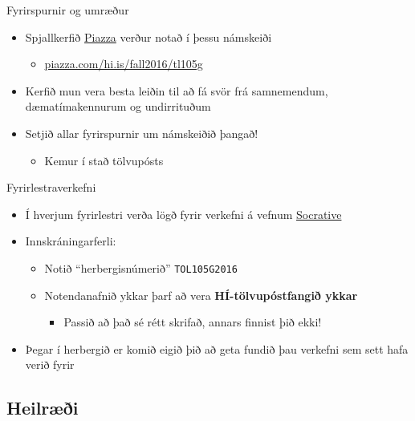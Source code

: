 \documentclass{beamer}
\begin{document}
\begin{frame}{Fyrirspurnir og umræður}
\label{frame:piazza}
\begin{itemize}
 \item Spjallkerfið \href{piazza.com/hi.is/fall2016/tl105g}{Piazza} verður notað í þessu námskeiði
 \begin{itemize}
  \item \url{piazza.com/hi.is/fall2016/tl105g}
 \end{itemize}
 \item Kerfið mun vera besta leiðin til að fá svör frá samnemendum, dæmatímakennurum og undirrituðum
 \item Setjið allar fyrirspurnir um námskeiðið þangað!
 \begin{itemize}
  \item Kemur í stað tölvupósts
 \end{itemize}
\end{itemize}
\end{frame}

\begin{frame}{Fyrirlestraverkefni}
\begin{itemize}
 \item Í hverjum fyrirlestri verða lögð fyrir verkefni á vefnum \href{http://socrative.com/}{Socrative}
 \item Innskráningarferli:
 \begin{itemize}
  \item Notið ``herbergisnúmerið'' \texttt{TOL105G2016}
  \item Notendanafnið ykkar þarf að vera \textbf{HÍ-tölvupóstfangið ykkar}
  \begin{itemize}
   \item Passið að það sé rétt skrifað, annars finnist þið ekki!
  \end{itemize}
 \end{itemize}
 \item Þegar í herbergið er komið eigið þið að geta fundið þau verkefni sem sett hafa verið fyrir
\end{itemize}
\end{frame}

\subsection{Heilræði}
\end{document}
